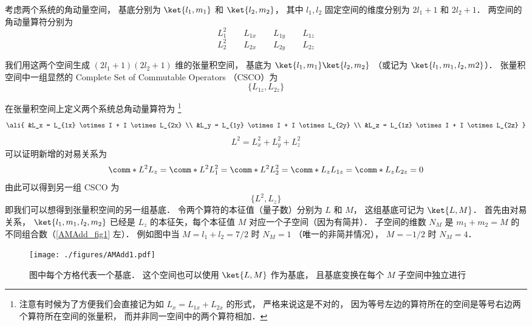 

考虑两个系统的角动量空间， 基底分别为 $\ket{l_1, m_1}$ 和 $\ket{l_2, m_2}$， 其中 $l_1, l_2$ 固定空间的维度分别为 $2l_1+1$ 和 $2l_2+1$． 两空间的角动量算符分别为
\begin{equation}
L_1^2 \qquad L_{1x} \qquad L_{1y} \qquad L_{1z}
\end{equation}
\begin{equation}
L_2^2 \qquad L_{2x} \qquad L_{2y} \qquad L_{2z}
\end{equation}

我们用这两个空间生成 $(2l_1+1)(2l_2+1)$ 维的张量积空间， 基底为 $\ket{l_1, m_1} \ket{l_2, m_2}$ （或记为 $\ket{l_1, m_1, l_2, m2}$）． 张量积空间中一组显然的 Complete Set of Commutable Operators （CSCO）为
\begin{equation}
\{L_{1z}, L_{2z}\}
\end{equation}

在张量积空间上定义两个系统总角动量算符为%
\footnote{注意有时候为了方便我们会直接记为如 $L_x = L_{1x} + L_{2x}$ 的形式， 严格来说这是不对的， 因为等号左边的算符所在的空间是等号右边两个算符所在空间的张量积， 而并非同一空间中的两个算符相加．}
\begin{equation}\ali{
&L_x = L_{1x} \otimes I +  I \otimes L_{2x} \\
&L_y = L_{1y} \otimes I +  I \otimes L_{2y} \\
&L_z = L_{1z} \otimes I +  I \otimes L_{2z}
}\end{equation}
\begin{equation}
L^2 = L_x^2 + L_y^2 + L_z^2
\end{equation}
可以证明新增的对易关系为
\begin{equation}
\comm*{L^2}{L_z} = \comm*{L^2}{L_1^2} = \comm*{L^2}{L_2^2} = 
\comm*{L_z}{L_{1z}} = \comm*{L_z}{L_{2z}} = 0
\end{equation}
由此可以得到另一组 CSCO 为 %
\begin{equation}
\{L^2, L_z\}
\end{equation}
即我们可以想得到张量积空间的另一组基底． 令两个算符的本征值（量子数）分别为 $L$  和 $M$， 这组基底可记为 $\ket{L, M}$．  首先由对易关系， $\ket{l_1, m_1, l_2, m_2}$ 已经是 $L_z$ 的本征矢，每个本征值 $M$ 对应一个子空间（因为有简并）． 子空间的维数 $N_M$ 是 $m_1 + m_2 = M$ 的不同组合数（\autoref{AMAdd_fig1} 左）． 例如图中当 $M = l_1 + l_2 = 7/2$ 时 $N_M = 1$ （唯一的非简并情况）， $M = -1/2$ 时 $N_M = 4$．
\begin{figure}[ht]
\centering
\texttt{[image: ./figures/AMAdd1.pdf]}
\caption{图中每个方格代表一个基底． 这个空间也可以使用 $\ket{L, M}$ 作为基底， 且基底变换在每个 $M$ 子空间中独立进行} \label{AMAdd_fig1}
\end{figure}

